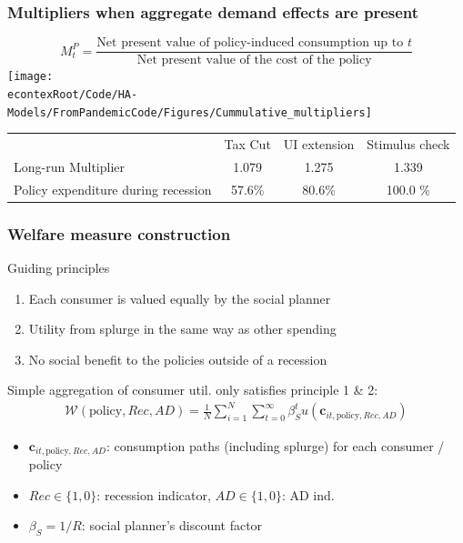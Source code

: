 \documentclass[pdflatex,aspectratio=169]{beamer}
\begin{document}
\begin{frame}
\frametitle{Multipliers when aggregate demand effects are present}
\begin{equation*}
M^P_t = \frac{\text{Net present value of policy-induced consumption up to $t$}}{\text{Net present value of the cost of the policy}}
\end{equation*}
\centering
\texttt{[image: \\econtexRoot/Code/HA-Models/FromPandemicCode/Figures/Cummulative\_multipliers]}
\footnotesize
\begin{tabular}{@{}lccc@{}} 
	& Tax Cut    & UI extension    & Stimulus check    \\ 
	Long-run Multiplier  &1.079  & 1.275  & 1.339     \\ 
	Policy expenditure during recession  &57.6\%  & 80.6\%  & 100.0 \%    \\ 
\end{tabular}  
\normalsize 
\end{frame}

\begin{frame}
\frametitle{Welfare measure construction}

	Guiding principles
	
	\begin{enumerate}
		\item Each consumer is valued equally by the social planner 
		\item Utility from splurge in the same way as other spending
		\item No social benefit to the policies outside of a recession
	\end{enumerate} 
	
	\vspace{0.6cm}
	
	Simple aggregation of consumer util. only satisfies principle 1 \& 2:
	\begin{align*}
	\mathcal{W}(\text{policy},Rec,AD) =\frac{1}{N}\sum_{i=1}^{N} \sum_{t=0}^{\infty} \beta_S^t u(\mathbf{c}_{it,\text{policy},Rec,AD}) 
	\end{align*}
	
	\begin{itemize}
		\item $\mathbf{c}_{it,\text{policy},Rec,AD}$: consumption paths (including splurge) for each consumer / policy
		\item $Rec\in\{1,0\}$: recession indicator, $AD\in\{1,0\}$: AD ind.
		\item $\beta_S = 1/R$: social planner's discount factor 
	\end{itemize}	

\end{frame}
\end{document}
